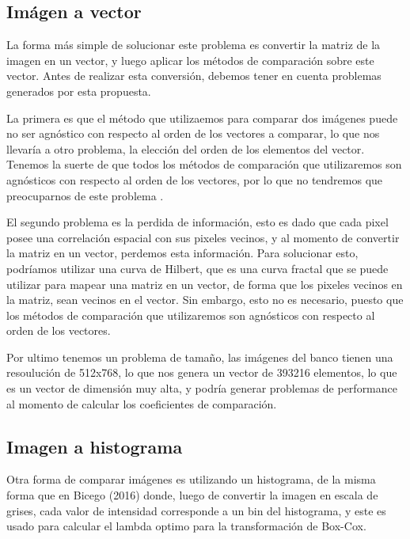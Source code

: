 \subsection{Im\'agen a vector}

La forma m\'as simple de solucionar este problema es convertir la matriz de la imagen en un vector, y luego aplicar los m\'etodos de comparaci\'on sobre este vector. Antes de realizar esta conversi\'on, debemos tener en cuenta problemas generados por esta propuesta. 

La primera es que el m\'etodo que utilizaemos para comparar dos im\'agenes puede no ser agn\'ostico con respecto al orden de los vectores a comparar, lo que nos llevaría a otro problema, la elecci\'on del orden de los elementos del vector. Tenemos la suerte de que todos los m\'etodos de comparaci\'on que utilizaremos son agn\'osticos con respecto al orden de los vectores, por lo que no tendremos que preocuparnos de este problema \cite{Reshef2016} \cite{Szekely2009}.

El segundo problema es la perdida de informaci\'on, esto es dado que cada pixel posee una correlaci\'on espacial con sus pixeles vecinos, y al momento de convertir la matriz en un vector, perdemos esta informaci\'on. Para solucionar esto, podr\'iamos utilizar una curva de Hilbert, que es una curva fractal que se puede utilizar para mapear una matriz en un vector, de forma que los pixeles vecinos en la matriz, sean vecinos en el vector. Sin embargo, esto no es necesario, puesto que los m\'etodos de comparaci\'on que utilizaremos son agn\'osticos con respecto al orden de los vectores.

Por ultimo tenemos un problema de tama\~no, las im\'agenes del banco tienen una resouluci\'on de 512x768, lo que nos genera un vector de 393216 elementos, lo que es un vector de dimensi\'on muy alta, y podr\'ia generar problemas de performance al momento de calcular los coeficientes de comparaci\'on. 

\subsection{Imagen a histograma}

Otra forma de comparar im\'agenes es utilizando un histograma, de la misma forma que en Bicego (2016)\cite{bicego2016} donde, luego de convertir la imagen en escala de grises, cada valor de intensidad corresponde a un bin del histograma, y este es usado para calcular el lambda optimo para la transformaci\'on de Box-Cox. 

